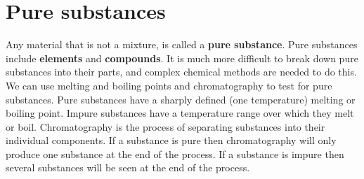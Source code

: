             \section{Pure substances}
            \nopagebreak
      \label{m38708*id63273}Any material that is not a mixture, is called a \textbf{pure substance}. Pure substances include \textbf{elements} and \textbf{compounds}. It is much more difficult to break down pure substances into their parts, and complex chemical methods are needed to do this.\\
      \label{m38708*eip-862}We can use melting and boiling points and chromatography to test for pure substances. Pure substances have a sharply defined (one temperature) melting or boiling point. Impure substances have a temperature range over which they melt or boil.  Chromatography is the process of separating substances into their individual components. If a substance is pure then chromatography will only produce one substance at the end of the process. If a substance is impure then several substances will be seen at the end of the process.  
